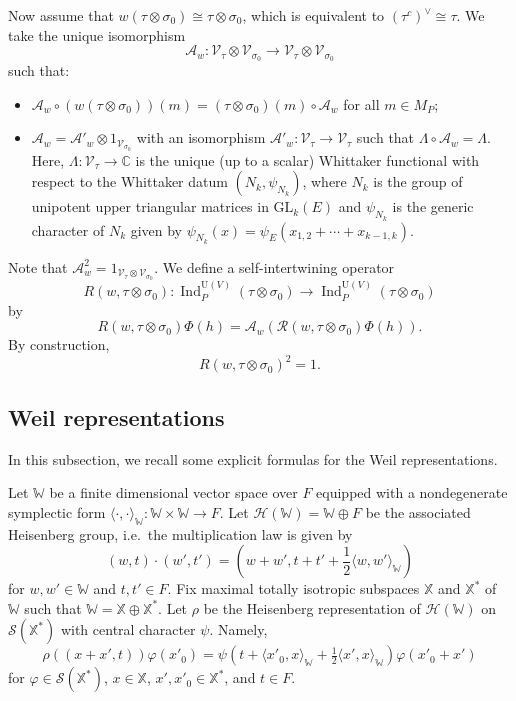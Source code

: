 \documentclass[11pt]{amsart}
\numberwithin{equation}{section}
\theoremstyle{plain}
\theoremstyle{definition}
\theoremstyle{remark}
\def\Ind{\operatorname{Ind}}
\def\GL{\mathrm{GL}}
\def\U{\mathrm{U}}
\def\CC{\mathbb{C}}
\def\WW{\mathbb{W}}
\def\XX{\mathbb{X}}
\def\A{\mathcal{A}}
\def\R{\mathcal{R}}
\def\H{\mathscr{H}}
\def\s{\mathscr{S}}
\def\V{\mathscr{V}}
\begin{document}
Now assume that $w(\tau \otimes \sigma_0) \cong \tau \otimes \sigma_0$, which is equivalent to $(\tau^c)^\vee \cong \tau$.
We take the unique isomorphism
\[
 \A_w : \V_{\tau} \otimes \V_{\sigma_0} \longrightarrow \V_{\tau} \otimes \V_{\sigma_0}
\]
such that:
\begin{itemize}
 \item $\A_w \circ (w(\tau \otimes \sigma_0))(m) = (\tau \otimes \sigma_0)(m) \circ \A_w$ for all $m \in M_P$;
 \item $\A_w = \A'_w \otimes 1_{\V_{\sigma_0}}$ with an isomorphism $\A'_w : \V_\tau \rightarrow \V_\tau$ such that $\Lambda \circ \A_w = \Lambda$. Here, $\Lambda : \V_\tau \rightarrow \CC$ is the unique (up to a scalar) Whittaker functional with respect to the Whittaker datum $(N_k, \psi_{N_k})$, 
where $N_k$ is the group of unipotent upper triangular matrices in $\GL_k(E)$ and $\psi_{N_k}$ is the generic character of $N_k$ given by $\psi_{N_k}(x) = \psi_E(x_{1,2} + \cdots + x_{k-1,k})$.
\end{itemize}
Note that $\A_w^2 = 1_{\V_{\tau} \otimes \V_{\sigma_0}}$.
We define a self-intertwining operator 
\[
  R(w, \tau \otimes \sigma_0) :
 \Ind^{\U(V)}_P(\tau \otimes \sigma_0) \longrightarrow 
 \Ind^{\U(V)}_P(\tau \otimes \sigma_0)
\]
by
\[
 R(w,\tau \otimes \sigma_0) \Phi(h) = \A_w(\R(w,\tau \otimes \sigma_0) \Phi(h)).
\]
By construction,
\[
 R(w,\tau \otimes \sigma_0)^2 = 1.
\]

\subsection{Weil representations}

In this subsection, we recall some explicit formulas for the Weil representations. 

Let $\WW$ be a finite dimensional vector space over $F$ equipped with a nondegenerate symplectic form $\langle \cdot , \cdot \rangle_\WW : \WW \times \WW \rightarrow F$.
Let $\H(\WW) = \WW \oplus F$ be the associated Heisenberg group, i.e.~the multiplication law is given by 
\[
 (w, t) \cdot (w', t') = \left( w+w', t+t' + \frac{1}{2} \langle w, w' \rangle_\WW \right)
\]
for $w, w' \in \WW$ and $t, t' \in F$.
Fix maximal totally isotropic subspaces $\XX$ and $\XX^*$ of $\WW$ such that $\WW = \XX \oplus \XX^*$.
Let $\rho$ be the Heisenberg representation of $\H(\WW)$ on $\s(\XX^*)$ with central character $\psi$.
Namely, 
\[
 \rho((x+x', t)) \varphi(x'_0)
 = \psi(t + \langle x'_0, x \rangle_\WW + \tfrac{1}{2} \langle x', x \rangle_\WW)
 \varphi(x'_0+x')
\]
for $\varphi \in \s(\XX^*)$, $x \in \XX$, $x', x'_0 \in \XX^*$, and $t \in F$.
\end{document}

